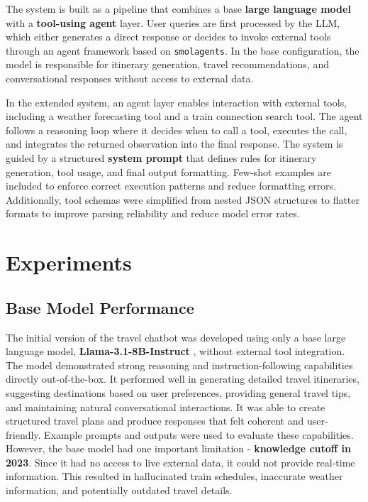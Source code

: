 \documentclass[fleqn,moreauthors,10pt]{ds_report}
\begin{document}
The system is built as a pipeline that combines a base \textbf{large language model} with a \textbf{tool-using agent} layer. User queries are first processed by the LLM, which either generates a direct response or decides to invoke external tools through an agent framework based on \texttt{smolagents}. In the base configuration, the model is responsible for itinerary generation, travel recommendations, and conversational responses without access to external data.

In the extended system, an agent layer enables interaction with external tools, including a weather forecasting tool and a train connection search tool. The agent follows a reasoning loop where it decides when to call a tool, executes the call, and integrates the returned observation into the final response.
The system is guided by a structured \textbf{system prompt} that defines rules for itinerary generation, tool usage, and final output formatting. Few-shot examples are included to enforce correct execution patterns and reduce formatting errors. Additionally, tool schemas were simplified from nested JSON structures to flatter formats to improve parsing reliability and reduce model error rates.





\section*{Experiments}
\subsection*{Base Model Performance}

The initial version of the travel chatbot was developed using only a base large language model, \textbf{Llama-3.1-8B-Instruct} \cite{llama3},  without external tool integration. The model demonstrated strong reasoning and instruction-following capabilities directly out-of-the-box. It performed well in generating detailed travel itineraries, suggesting destinations based on user preferences, providing general travel tips, and maintaining natural conversational interactions. It was able to create structured travel plans and produce responses that felt coherent and user-friendly. Example prompts and outputs were used to evaluate these capabilities. However, the base model had one important limitation - \textbf{knowledge cutoff in 2023}. Since it had no access to live external data, it could not provide real-time information. This resulted in hallucinated train schedules, inaccurate weather information, and potentially outdated travel details.
\end{document}
